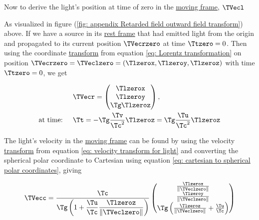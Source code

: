 Now to derive the light's position at time of zero in the \hyperlink{def-Moving-Frame}{moving frame}, $\TVecl $

\begin{derivation}

	As visualized in figure (\ref{fig: appendix Retarded field outward field transform}) above.
	If we have a source in its \hyperlink{def-proper-frame}{rest frame} that had emitted light from the origin and propagated to its current position $\TVecrzero $ at time ${\Ttzero } = 0$.
	Then using the coordinate \hyperlink{def-transform}{transform} from equation \eqref{eq: Lorentz transformation} on position $\TVecrzero =\TVeclzero =(\Tlzerox ,\Tlzeroy ,\Tlzeroz )$ with time ${\Ttzero } = 0$, we get

	\begin{equation}
		\label{eq: displacement transform}
		\begin{aligned}
			&\TVecr   =
			\begin{pmatrix}
				\Tlzerox           \\
				\Tlzeroy           \\
				{\Tg } \Tlzeroz  \\
			\end{pmatrix},                                                                         \\
			\text{at time: }\quad& {\Tt }=-{\Tg } \frac{ \Tv  }{ \Tc ^2}{\Tlzeroz  } = \Tg  \frac{\Tu }{ \Tc ^2}{\Tlzeroz  } \\
		\end{aligned}
	\end{equation}

	The light's velocity in the \hyperlink{def-Moving-Frame}{moving frame} can be found by using the velocity \hyperlink{def-transform}{transform} from equation \eqref{eq: velocity transform for light} and converting the spherical polar coordinate to Cartesian using equation \eqref{eq: cartesian to spherical polar coordinates}, giving

	\begin{equation}
		\label{eq: light pulse velocity transform}
		\TVecc  =
		\dfrac{\Tc }{\Tg  \left(1 + \dfrac{\Tu }{\Tc } \dfrac{\Tlzeroz  }{\|\TVeclzero \|} \right)}
		\begin{pmatrix}
			\frac{\Tlzerox  }{\|\TVeclzero \|}                                      \\
			\frac{\Tlzeroy  }{\|\TVeclzero \|}                                      \\
			\Tg  \left( \frac{\Tlzeroz  }{\|\TVeclzero \|} + \frac{\Tu }{\Tc }  \right) \\
		\end{pmatrix}
	\end{equation}


\end{derivation}
